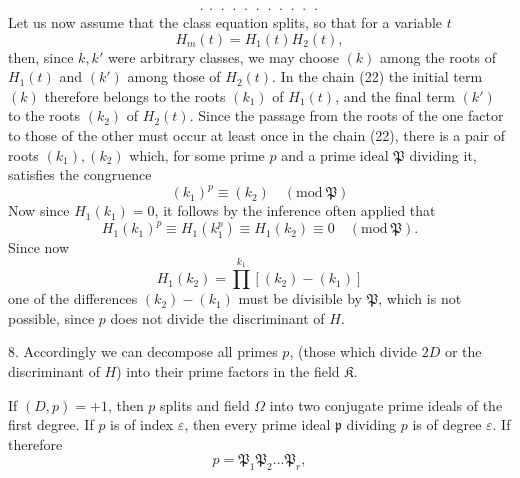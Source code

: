\[
\cdot\ \cdot\ \cdot\ \cdot\ \cdot\ \cdot\ \cdot\ \cdot\ \cdot\ \cdot\ \cdot
\]
Let us now assume that the class equation splits, so that for a
variable $t$
\[
H_m(t) = H_1(t) H_2(t),
\]
then, since $k, k'$ were arbitrary classes, we may choose $(k)$ among
the roots of $H_1(t)$ and $(k')$ among those of $H_2(t)$. In the
chain (22) the initial term $(k)$ therefore belongs to the roots $(k_1)$
of $H_1(t)$, and the final term $(k')$ to the roots $(k_2)$ of $H_2(t)$.
Since the passage from the roots of the one factor to those of
the other must occur at least once in the chain (22),
there is a pair of roots $(k_1), (k_2)$ which, for some
prime $p$ and a prime ideal $\mathfrak P$ dividing it, satisfies the
congruence
\[
(k_1)^p \equiv (k_2) \quad (\mathrm{mod}\ \mathfrak P)
\]
Now since $H_1(k_1) = 0$, it follows by the inference often applied that
\[
H_1(k_1)^p \equiv H_1(k_1^p) \equiv H_1(k_2) \equiv 0 \quad (\mathrm{mod}\ \mathfrak P).
\]
Since now
\[
H_1(k_2) = \prod^{k_1} [(k_2) - (k_1)]
\]
one of the differences $(k_2) - (k_1)$ must be divisible by $\mathfrak P$,
which is not possible, since $p$ does not divide the discriminant
of $H$.


8. Accordingly we can decompose all primes $p$,  (those which divide $2D$
or the discriminant of $H$) into their prime factors
in the field $\mathfrak K$.

If $(D, p) = +1$, then $p$ splits and field $\Omega$ %
into two conjugate prime ideals of the first degree. If $p$ is of index $\varepsilon$, then
every prime ideal $\mathfrak p$ dividing $p$ is of degree $\varepsilon$. If therefore
\[
p = \mathfrak P_1 \mathfrak P_2 \ldots \mathfrak P_r,
\]
